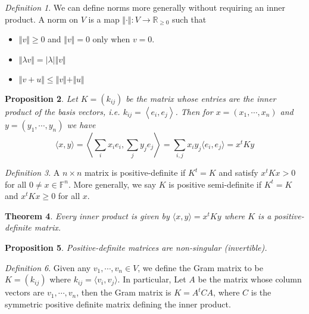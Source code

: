 \documentclass[12pt]{amsart}
\renewcommand{\leq}{\leqslant}
\newcommand{\fff}[0]{\mathbb{F}}
\renewcommand{\geq}{\geqslant}
\DeclareMathOperator{\End}{End}
\newtheorem{theorem}{Theorem}[section]
\newtheorem{proposition}[theorem]{Proposition}
\theoremstyle{remark}
\newtheorem{definition}[theorem]{Definition}
\numberwithin{equation}{section}
\begin{document}
	\begin{definition}
		We can define norms more generally without requiring an inner product. A norm on $V$ is a map $\Vert\cdot \Vert :V\to \mathbb{R}_{\geq 0}$ such that
		\begin{itemize}
			\item $\Vert v\Vert\geq 0$ and $\Vert v\Vert =0$ only when $v=0$.
			\item $\Vert \lambda v \Vert = \vert\lambda\vert \Vert v\Vert$
			\item $ \Vert v+u\Vert \leq \Vert v\Vert +\Vert u\Vert$
		\end{itemize}
	\end{definition}
%	
\begin{proposition}
	Let $K=(k_{ij})$ be the matrix whose entries are the inner product of the basis vectors, i.e. $k_{ij}=\left \langle e_i,e_j\right \rangle$. Then for $x=(x_1,\cdots,x_n)$ and $y=(y_1,\cdots,y_n)$ we have
	\[\langle x,y\rangle=\left \langle \sum_i x_ie_i,\sum_j y_je_j\right \rangle = \sum_{i,j} x_iy_j \langle e_i,e_j\rangle=x^tKy\]
\end{proposition}
\begin{definition}
	A $n\times n$ matrix is positive-definite if $K^t=K$ and satisfy
	$x^tKx>0$ for all $0\neq x\in\fff^n$. More generally, we say $K$ is positive semi-definite if $K^t=K$ and $x^tKx\geq 0$ for all $x$.
\end{definition}
\begin{theorem}
Every inner product is given by $\langle x,y\rangle =x^t Ky$ where $K$ is a positive-definite matrix.
	\end{theorem}
	\begin{proposition}
		Positive-definite matrices are non-singular (invertible).
	\end{proposition}
	\begin{definition}
		Given any $v_1,\cdots,v_n\in V$, we define the Gram matrix to be $K=(k_{ij})$ where $k_{ij}=\langle v_i,v_j\rangle$. In particular, Let $A$ be the matrix whose column vectors are $v_1,\cdots,v_n$, then the Gram matrix is $K=A^tCA$, where $C$ is the symmetric positive definite matrix defining the inner product.
	\end{definition}
\end{document}
